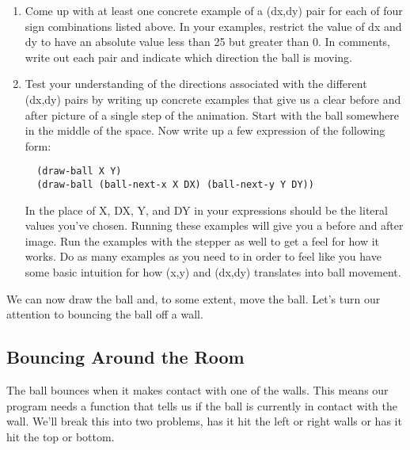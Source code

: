 \documentclass[nobib]{tufte-handout}
\begin{document}
\begin{enumerate}[resume]
  \item Come up with at least one concrete example of a (dx,dy) pair for each of four sign combinations listed above. In your examples, restrict the value of dx and dy to have an absolute value less than 25 but greater than 0. In comments, write out each pair and indicate which direction the ball is moving.

  \item Test your understanding of the directions associated with the different (dx,dy) pairs by writing up concrete examples that give us a clear before and after picture of a single step of the animation. Start with the ball somewhere in the middle of the space. Now write up a few expression of the following form:

  \begin{lstlisting}
  (draw-ball X Y)
  (draw-ball (ball-next-x X DX) (ball-next-y Y DY))
  \end{lstlisting}

  In the place of X, DX, Y, and DY in your expressions should be the literal values you've chosen. Running these examples will give you a before and after image. Run the examples with the stepper as well to get a feel for how it works. Do as many examples as you need to in order to feel like you have some basic intuition for how (x,y) and (dx,dy) translates into ball movement.

\end{enumerate}

We can now draw the ball and, to some extent, move the ball. Let's turn our attention to bouncing the ball off a wall.

\subsection*{Bouncing Around the Room}

The ball bounces when it makes contact with one of the walls. This means our program needs a function that tells us if the ball is currently in contact with the wall. We'll break this into two problems, has it hit the left or right walls or has it hit the top or bottom.
\end{document}

